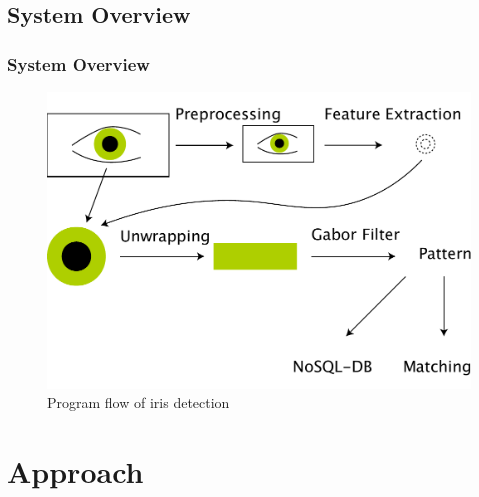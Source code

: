\documentclass{beamer}
\begin{document}
\subsection{System Overview}
\begin{frame}
    \frametitle{System Overview}
    \begin{figure}
        [ht] \centering
        \includegraphics[width=0.85
        \textwidth]{../report/iris/flow} \caption{Program flow of iris detection} \label{fig:flow}
    \end{figure}
\end{frame}
\section{Approach}
\end{document}
